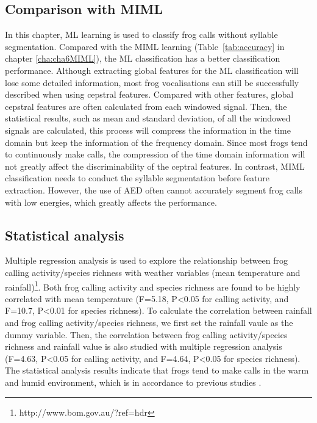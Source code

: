 \subsection{Comparison with MIML}
In this chapter, ML learning is used to classify frog calls without syllable segmentation. Compared with the MIML learning (Table~\ref{tab:accuracy} in chapter \ref{cha:cha6MIML}), the ML classification has a better classification performance. Although extracting global features for the ML classification will lose some detailed information, most frog vocalisations can still be successfully described when using cepstral features.
Compared with other features, global cepstral features are often calculated from each windowed signal. Then, the statistical results, such as mean and standard deviation, of all the windowed signals are calculated, this process will compress the information in the time domain but keep the information of the frequency domain. Since most frogs tend to continuously make calls, the compression of the time domain information will not greatly affect the discriminability of the ceptral features. In contrast, MIML classification needs to conduct the syllable segmentation before feature extraction. However, the use of AED often cannot accurately segment frog calls with low energies, which greatly affects the performance.






\subsection{Statistical analysis}
Multiple regression analysis is used to explore the relationship between frog calling activity/species richness with weather variables (mean temperature and rainfall)\footnote[5] {http://www.bom.gov.au/?ref=hdr}. Both frog calling activity and species richness are found to be highly correlated with mean temperature (F=5.18, P\textless0.05 for calling activity, and F=10.7, P\textless0.01 for species richness). To calculate the correlation between rainfall and frog calling activity/species richness, we first set the rainfall vaule as the dummy variable. Then, the correlation between frog calling activity/species richness and rainfall value is also studied with multiple regression analysis (F=4.63, P\textless0.05 for calling activity, and F=4.64, P\textless0.05 for species richness). The statistical analysis results indicate that frogs tend to make calls in the warm and humid environment, which is in accordance to previous studies \citep{akmentins2015patterns, canavero2008calling}.



